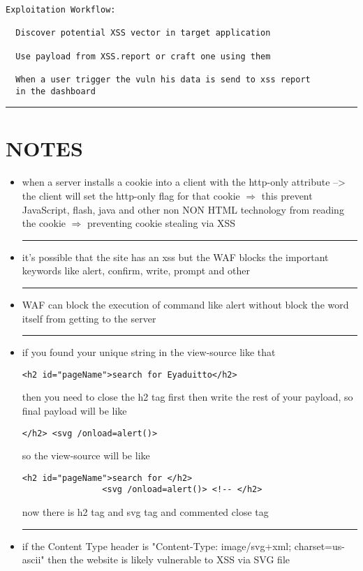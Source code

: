 \documentclass{article}
\begin{document}
\begin{lstlisting}[frame=single]
Exploitation Workflow:

  Discover potential XSS vector in target application

  Use payload from XSS.report or craft one using them

  When a user trigger the vuln his data is send to xss report 
  in the dashboard
    \end{lstlisting}

\rule{15cm}{0.6pt}
\section*{NOTES}
\begin{itemize}
    \item when a server installs a cookie into a client with the http-only attribute -->
          the client will set the http-only flag for that cookie $\Longrightarrow$ this
          prevent JavaScript, flash, java and other non NON HTML technology from reading
          the cookie $\Longrightarrow$ preventing cookie stealing via XSS\\
    \rule{5cm}{0.4pt}
    \item it's possible that the site has an xss but the WAF blocks the important
          keywords like alert, confirm, write, prompt and other\\
    \rule{5cm}{0.4pt}
    \item WAF can block the execution of command like alert without block the word itself
          from getting to the server\\
    \rule{5cm}{0.4pt}
    \item if you found your unique string in the view-source like that
          \begin{lstlisting}[frame=single]
                <h2 id="pageName">search for Eyaduitto</h2>
            \end{lstlisting}
          then you need to close the h2 tag first then write the rest of your payload, so
          final payload will be like
          \begin{lstlisting}[frame=single]
                    </h2> <svg /onload=alert()>
            \end{lstlisting}
          so the view-source will be like
          \begin{lstlisting}[frame=single]
                <h2 id="pageName">search for </h2>
                <svg /onload=alert()> <!-- </h2>
            \end{lstlisting}
          now there is h2 tag and svg tag and commented close tag\\
    \rule{5cm}{0.4pt}
    \item if the Content Type header is "Content-Type: image/svg+xml; charset=us-ascii"
          then the website is likely vulnerable to XSS via SVG file\\


\end{itemize}
\end{document}

